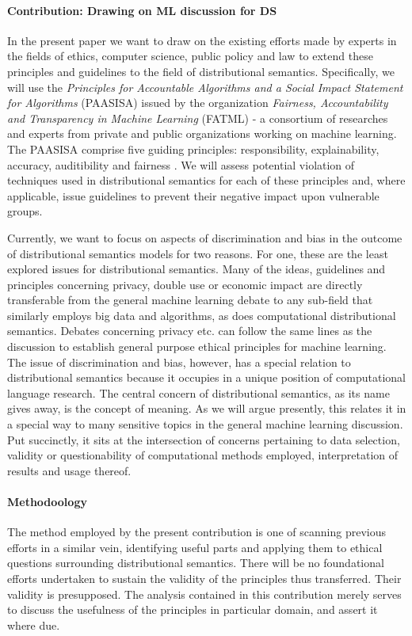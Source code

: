 \documentclass{article}
\begin{document}
\paragraph{Contribution: Drawing on ML discussion for DS}
In the present paper we want to draw on the existing efforts made by experts in the fields of ethics, computer science, public policy and law to extend these principles and guidelines to the field of distributional semantics. Specifically, we will use the \emph{Principles for Accountable Algorithms and a Social Impact Statement for Algorithms} (PAASISA) issued by the organization \emph{Fairness, Accountability and Transparency in Machine Learning} (FATML) - a consortium of researches and experts from private and public organizations working on machine learning. 
The PAASISA comprise five guiding principles: responsibility, explainability, accuracy, auditibility and fairness \cite{principles}.
We will assess potential violation of techniques used in distributional semantics for each of these principles and, where applicable, issue guidelines to prevent their negative impact upon vulnerable groups. 

Currently, we want to focus on aspects of discrimination and bias in the outcome of distributional semantics models for two reasons. For one, these are the least explored issues for distributional semantics. Many of the ideas, guidelines and principles concerning privacy, double use or economic impact are directly transferable from the general machine learning debate to any sub-field that similarly employs big data and algorithms, as does computational distributional semantics. Debates concerning privacy etc. can follow the same lines as the discussion to establish general purpose ethical principles for machine learning. The issue of discrimination and bias, however, has a special relation to distributional semantics because it occupies in a unique position of computational language research. The central concern of distributional semantics, as its name gives away, is the concept of meaning. As we will argue presently, this relates it in a special way to many sensitive topics in the general machine learning discussion. Put succinctly, it sits at the intersection of concerns pertaining to data selection, validity or questionability of computational methods employed, interpretation of results and usage thereof.

\paragraph{Methodoology}
The method employed by the present contribution is one of scanning previous efforts in a similar vein, identifying useful parts and applying them to ethical questions surrounding distributional semantics. There will be no foundational efforts undertaken to sustain the validity of the principles thus transferred.  Their validity is presupposed. The analysis contained in this contribution merely serves to discuss the usefulness of the principles in particular domain, and assert it where due.
\end{document}

